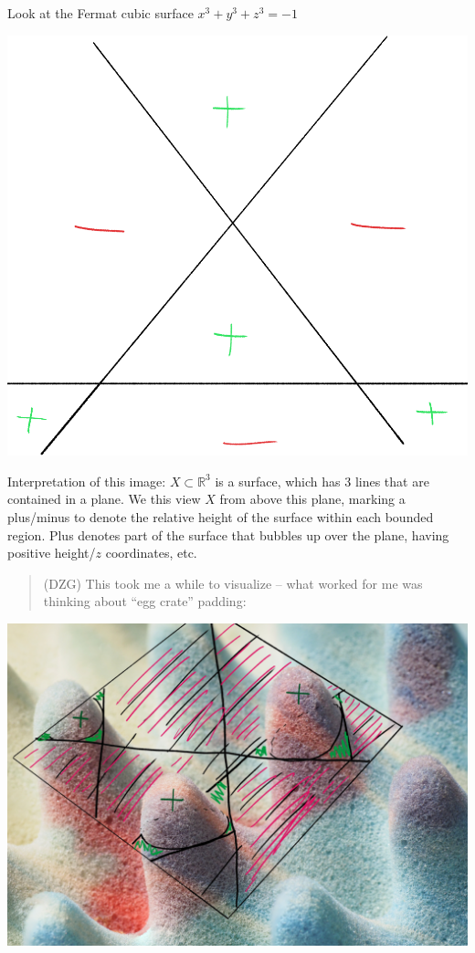 \begin{example}[?]

Look at the Fermat cubic surface \(x^3+y^3+z^3=-1\)

\includegraphics{assets/2019-03-03-22-11-15.png}

Interpretation of this image: \(X \subset {\mathbb{R}}^3\) is a surface,
which has 3 lines that are contained in a plane. We this view \(X\) from
above this plane, marking a plus/minus to denote the relative height of
the surface within each bounded region. Plus denotes part of the surface
that bubbles up over the plane, having positive height/\(z\)
coordinates, etc.

\begin{quote}
(DZG) This took me a while to visualize -- what worked for me was
thinking about ``egg crate'' padding:
\end{quote}

\includegraphics{assets/2019-03-03-22-27-49.png}

\end{example}

